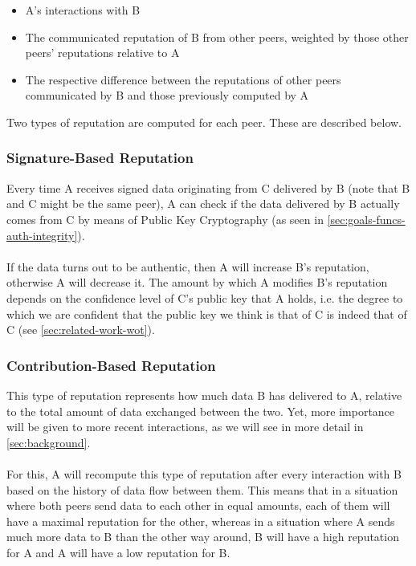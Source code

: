 \documentclass[]{article}
\begin{document}
\begin{itemize}
\item A's interactions with B
\item The communicated reputation of B from other peers, weighted by those other peers' reputations relative to A
\item The respective difference between the reputations of other peers communicated by B and those previously computed by A
\end{itemize}

Two types of reputation are computed for each peer. These are described below.

\subsubsection{Signature-Based Reputation}
\label{sec:sig-based-rep}
Every time A receives signed data originating from C delivered by B (note that B and C might be the same peer), A can check if the data delivered by B actually comes from C by means of Public Key Cryptography (as seen in \ref{sec:goals-funcs-auth-integrity}).
\\\\
If the data turns out to be authentic, then A will increase B's reputation, otherwise A will decrease it.
The amount by which A modifies B's reputation depends on the confidence level of C's public key that A holds, i.e. the degree to which we are confident that the public key we think is that of C is indeed that of C (see \ref{sec:related-work-wot}).

\subsubsection{Contribution-Based Reputation}
This type of reputation represents how much data B has delivered to A, relative to the total amount of data exchanged between the two.
Yet, more importance will be given to more recent interactions, as we will see in more detail in \ref{sec:background}.
\\\\
For this, A will recompute this type of reputation after every interaction with B based on the history of data flow between them.
This means that in a situation where both peers send data to each other in equal amounts, each of them will have a maximal reputation for the other, whereas in a situation where A sends much more data to B than the other way around, B will have a high reputation for A and A will have a low reputation for B.
\end{document}
